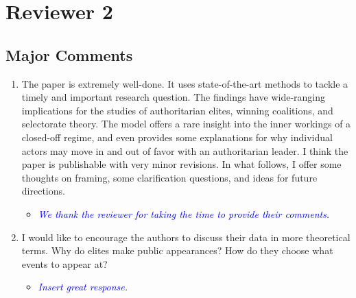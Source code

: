 \section*{Reviewer 2}

\subsection*{Major Comments}

\begin{enumerate}
	\item The paper is extremely well-done.  It uses state-of-the-art methods to tackle a timely and important research question. The findings have wide-ranging implications for the studies of authoritarian elites, winning coalitions, and selectorate theory.  The model offers a rare insight into the inner workings of a closed-off regime, and even provides some explanations for why individual actors may move in and out of favor with an authoritarian leader.  I think the paper is publishable with very minor revisions. In what follows, I offer some thoughts on framing, some clarification questions, and ideas for future directions.
	\begin{itemize}
		\item \textcolor{blue}{ \emph{
		We thank the reviewer for taking the time to provide their comments.
		}}
	\end{itemize}
	\item I would like to encourage the authors to discuss their data in more theoretical terms.  Why do elites make public appearances? How do they choose what events to appear at?
		\begin{itemize}
		\item \textcolor{blue}{ \emph{
			Insert great response.
			}}
	\end{itemize}


\end{enumerate}
